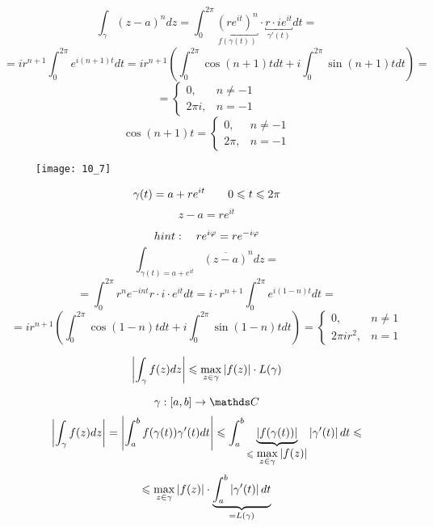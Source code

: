 \documentclass[main]{subfiles}
\begin{document}
    \begin{Example}[1]
        \[\int_\gamma (z - a)^n dz = \int_0^{2\pi} \underbracket{(re^{it} )^n
            }_{f(\gamma(t))} \cdot \underbracket{r \cdot ie^{it} }_{\gamma'(t)} dt = \]
        \[=ir^{n + 1} \int_0^{2\pi}e^{i(n + 1)t}dt = ir^{n + 1} (\int_0^{2\pi}
            \cos(n + 1)tdt + i\int_0^{2\pi} \sin(n + 1)tdt) =\]
        \[= \begin{cases}
                0,      & n \neq -1 \\
                2\pi i, & n = -1
            \end{cases}\]
        \[\cos(n + 1)t = \begin{cases}
                0,    & n \neq -1 \\
                2\pi, & n = -1
            \end{cases}\]
        \begin{figure}[H]
            \centering
            \texttt{[image: 10\_7]}
        \end{figure}
        \[\gamma(t) = a + re^{it} \qq 0 \leq t \leq 2\pi \]
        \[z - a = re^{it} \]
    \end{Example}

    \begin{Example}[2]
        \[hint: \q r e^{i\varphi} = r e^{-i \varphi}  \]
        \[\int_{\gamma(t) = a + e^{it} } \overline{(z - a)}^n dz =  \]
        \[=\int_0^{2\pi} r^n e^{-int} r \cdot i \cdot e^{it}dt =
            i \cdot r^{n + 1}  \int_0^{2\pi} e^{i(1 - n)t}dt =  \]
        \[=ir^{n + 1} \left(\int_0^{2\pi} \cos(1 - n)tdt + i\int_0^{2\pi}
            \sin(1 - n)tdt\right) = \begin{cases}
                0,          & n \neq 1 \\
                2\pi i r^2, & n = 1
            \end{cases}\]
    \end{Example}

    \begin{Utv}
        \[\abs{\int_\gamma f(z)dz} \leq \max_{z \in \gamma} \abs{f(z)} \cdot L(\gamma)\]
    \end{Utv}

    \begin{Proof}
        \[\gamma : [a, b] \to \CC\]
        \[\abs{\int_\gamma f(z)dz} = \abs{\int_a^b f(\gamma(t)) \gamma'(t)dt} \leq
            \int_a^b \ub{\leq \displaystyle \max_{z \in \gamma}
                \abs{f(z)}}{\abs{f(\gamma(t))} }\abs{\gamma'(t)}dt \leq \]
        \[\leq \max_{z \in \gamma} \abs{f(z)} \cdot \ub{= L(\gamma)}
            {\int_a^b \abs{\gamma'(t)}dt }\]
    \end{Proof}
\end{document}
